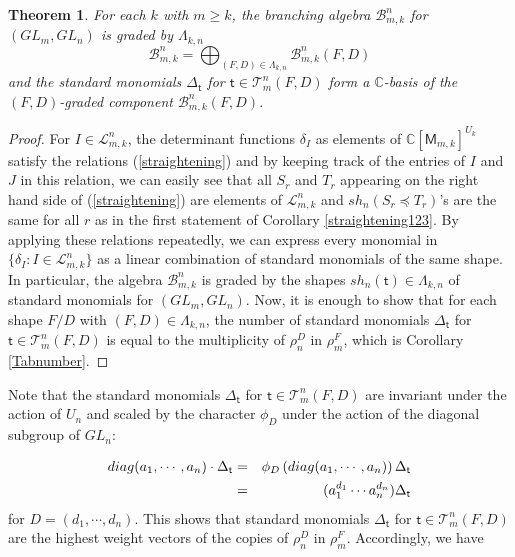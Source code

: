 \documentclass[11pt]{amsart}
\numberwithin{equation}{subsection}
\newtheorem{theorem}{Theorem}[subsection]
\begin{document}
\begin{theorem}\label{BB-standard}
For each $k$ with $m\geq k$, the branching algebra 
$\mathcal{B}_{m,k}^{n}$ for $({GL}_{m},{GL}_{n})$ is graded by 
$\Lambda_{k,n} $
\begin{equation*}
\mathcal{B}_{m,k}^{n}=\bigoplus_{(F,D)\in \Lambda _{k,n}}\mathcal{B}_{m,k}^{n}(F,D)
\end{equation*}
and the standard monomials $\Delta _{\mathsf{t}}$ for 
$\mathsf{t}\in \mathcal{T}_{m}^{n}(F,D)$ form a $\mathbb{C}$-basis of 
the $(F,D)$-graded component $\mathcal{B}_{m,k}^{n}(F,D)$.
\end{theorem}
\begin{proof}
For $I\in \mathcal{L}_{m,k}^{n}$, the determinant functions $\delta _{I}$ as
elements of $\mathbb{C}[\mathsf{M}_{m,k}]^{U_{k}}$ satisfy the relations 
(\ref{straightening}) and by keeping track of the entries of $I$ and $J$ in
this relation, we can easily see that all $S_{r}$ and $T_{r}$ appearing on
the right hand side of (\ref{straightening}) are elements of 
$\mathcal{L}_{m,k}^{n}$ and $sh_{n}(S_{r} \preceq T_{r})$'s are the same for all $r$ as 
in the first statement of Corollary \ref{straightening123}. By applying
these relations repeatedly, we can express every monomial in 
$\{\delta _{I}: I\in \mathcal{L}_{m,k}^{n}\}$ as a linear combination of standard 
monomials of the same shape. In particular, the algebra $\mathcal{B}_{m,k}^n$ is graded by 
the shapes $sh_n(\mathsf{t}) \in \Lambda_{k,n}$ of standard monomials for $(GL_m,GL_n)$.
Now, it is enough to show that for each shape $F/D$ with 
$(F,D)\in \Lambda _{k,n}$, the number of standard monomials 
$\Delta _{\mathsf{t}}$ for $\mathsf{t}\in \mathcal{T}_{m}^{n}(F,D)$ is equal to the
multiplicity of $\rho _{n}^{D}$ in $\rho _{m}^{F}$, which is Corollary 
\ref{Tabnumber}.
\end{proof}


Note that the standard monomials $\Delta _{\mathsf{t}}$ for 
$\mathsf{t}\in \mathcal{T}_{m}^{n}(F,D)$ are invariant under the action of $U_{n}$ and
scaled by the character $\phi_D$ under the action of the diagonal subgroup of $GL_{n}$:

\begin{eqnarray}\label{U-invariant-weight}
diag(a_{1},\cdots ,a_{n})\cdot \Delta _{\mathsf{t}} &=&
\phi_D \left( diag(a_{1},\cdots ,a_{n}) \right) \Delta _{\mathsf{t}} \\
&=&(a_{1}^{d_{1}}\cdots a_{n}^{d_{n}}) \Delta _{\mathsf{t}} \notag
\end{eqnarray}
for $D=(d_{1},\cdots ,d_{n})$. This shows that standard monomials 
$\Delta _{\mathsf{t}}$ for $\mathsf{t}\in \mathcal{T}_{m}^{n}(F,D)$ are the 
highest weight vectors of the copies of $\rho _{n}^{D}$ in $\rho _{m}^{F}$.
Accordingly, we have
\end{document}
